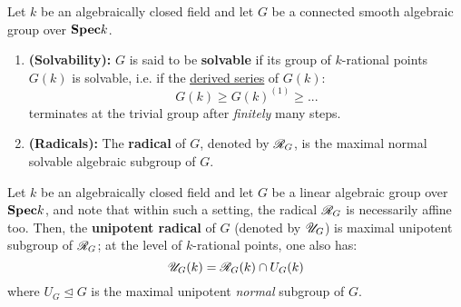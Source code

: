                     \begin{definition}[Radicals] \label{def: radicals_of_algebraic_groups}
                        Let $k$ be an algebraically closed field and let $G$ be a connected smooth algebraic group over $\mathbf{Spec} k$. 
                            \begin{enumerate}
                                \item \textbf{(Solvability):} $G$ is said to be \textbf{solvable} if its group of $k$-rational points $G(k)$ is solvable, i.e. if the \href{https://ncatlab.org/nlab/show/derived+series}{\underline{derived series}} of $G(k)$:
                                    $$G(k) \geq G(k)^{(1)} \geq ... $$
                                terminates at the trivial group after \textit{finitely} many steps. 
                                \item \textbf{(Radicals):} The \textbf{radical} of $G$, denoted by $\mathscr{R}_G$, is the maximal normal solvable algebraic subgroup of $G$. 
                            \end{enumerate}
                    \end{definition}
                    \begin{remark} \label{remark: unipotent_radicals}
                        Let $k$ be an algebraically closed field and let $G$ be a linear algebraic group over $\mathbf{Spec} k$, and note that within such a setting, the radical $\mathscr{R}_G$ is necessarily affine too. Then, the \textbf{unipotent radical} of $G$ (denoted by $\mathscr{U}_G$) is maximal unipotent subgroup of $\mathscr{R}_G$; at the level of $k$-rational points, one also has:
                            $$\mathscr{U}_G(k) = \mathscr{R}_G(k) \cap U_G(k)$$
                        where $U_G \trianglelefteq G$ is the maximal unipotent \textit{normal} subgroup of $G$.
                    \end{remark}
                    
